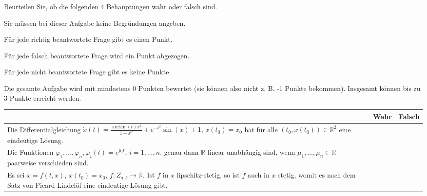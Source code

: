 \begin{Problem}
	Beurteilen Sie, ob die folgenden 4 Behauptungen wahr oder falsch sind.
	
	Sie müssen bei dieser Aufgabe keine Begründungen angeben.
	
	Für jede richtig beantwortete Frage gibt es einen Punkt.
	
	Für jede falsch beantwortete Frage wird ein Punkt abgezogen.
	
	Für jede nicht beantwortete Frage gibt es keine Punkte.
	
	Die gesamte Aufgabe wird mit mindestens 0 Punkten bewertet (sie können also nicht z. B. -1 Punkte bekommen). Insgesamt können bis zu 3 Punkte erreicht werden.
	
	\begin{tabularx}{\textwidth}{X|p{2cm}|p{2cm}|}
		& Wahr & Falsch \\\hline
		Die Differentialgleichung $\dot{x}(t) = \frac{\arctan(t)x^3}{1 + x^2} + e^{-t^2} \sin(x) + 1, \, x(t_0) = x_0$ hat für alle $(t_0, x(t_0)) \in \mathbb{R}^2$ eine eindeutige Lösung. & & \\\hline
	Die Funktionen $\varphi_1, \ldots, \varphi_n, \varphi_i(t) = e^{\mu_i t}, \, i = 1, \ldots, n$, genau dann $\mathbb{R}$-linear unabhängig sind, wenn $\mu_1, \ldots, \mu_n \in \mathbb{R}$ paarweise verschieden sind. & & \\\hline
		Es sei $\dot{x} = f(t, x), \, x(t_0) = x_0, \, f : Z_{a,b} \to \mathbb{R}$. Ist $f$ in $x$ lipschitz-stetig, so ist $f$ auch in $x$ stetig, womit es nach dem Satz von Picard-Lindelöf eine eindeutige Lösung gibt. & & \\\hline
	\end{tabularx}
\end{Problem}